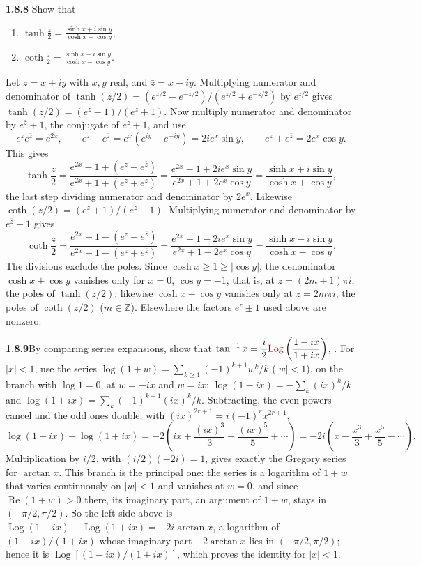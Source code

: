 \par\bigskip
\noindent\textbf{1.8.8}\quad {} Show that
\begin{enumerate}
\item[(a)] $\displaystyle\tanh\frac{z}{2}=\frac{\sinh x+i\sin y}{\cosh x+\cos y}$,
\item[(b)] $\displaystyle\coth\frac{z}{2}=\frac{\sinh x-i\sin y}{\cosh x-\cos y}$.
\end{enumerate}
\solution
Let $z=x+iy$ with $x,y$ real, and $\bar z=x-iy$. Multiplying numerator
and denominator of
$\tanh(z/2)=(e^{z/2}-e^{-z/2})/(e^{z/2}+e^{-z/2})$ by $e^{z/2}$ gives
$\tanh(z/2)=(e^z-1)/(e^z+1)$. Now multiply numerator and denominator
by $e^{\bar z}+1$, the conjugate of $e^z+1$, and use
\[
 e^ze^{\bar z}=e^{2x},\qquad
 e^z-e^{\bar z}=e^x(e^{iy}-e^{-iy})=2ie^x\sin y,\qquad
 e^z+e^{\bar z}=2e^x\cos y.
\]
This gives
\[
 \tanh\frac z2
 =\frac{e^{2x}-1+(e^z-e^{\bar z})}{e^{2x}+1+(e^z+e^{\bar z})}
 =\frac{e^{2x}-1+2ie^x\sin y}{e^{2x}+1+2e^x\cos y}
 =\frac{\sinh x+i\sin y}{\cosh x+\cos y},
\]
the last step dividing numerator and denominator by $2e^x$.
Likewise $\coth(z/2)=(e^z+1)/(e^z-1)$. Multiplying numerator and
denominator by $e^{\bar z}-1$ gives
\[
 \coth\frac z2
 =\frac{e^{2x}-1-(e^z-e^{\bar z})}{e^{2x}+1-(e^z+e^{\bar z})}
 =\frac{e^{2x}-1-2ie^x\sin y}{e^{2x}+1-2e^x\cos y}
 =\frac{\sinh x-i\sin y}{\cosh x-\cos y}.
\]
The divisions exclude the poles. Since $\cosh x\ge1\ge|\cos y|$, the
denominator $\cosh x+\cos y$ vanishes only for $x=0$, $\cos y=-1$,
that is, at $z=(2m+1)\pi i$, the poles of $\tanh(z/2)$; likewise
$\cosh x-\cos y$ vanishes only at $z=2m\pi i$, the poles of
$\coth(z/2)$ ($m\in\mathbb Z$). Elsewhere the factors $e^{\bar z}\pm1$
used above are nonzero.


\par\bigskip
\noindent\textbf{1.8.9}\quad By comparing series expansions, show that
$\displaystyle\tan^{-1}x=\frac{i}{2}\erratum{\operatorname{Log}}\left(\frac{1-ix}{1+ix}\right)$, .
\solution
For $|x|<1$, use the series
$\log(1+w)=\sum_{k\ge1}(-1)^{k+1}w^k/k$ ($|w|<1$), on the branch with
$\log1=0$, at $w=-ix$ and $w=ix$: $\log(1-ix)=-\sum_k(ix)^k/k$ and
$\log(1+ix)=\sum_k(-1)^{k+1}(ix)^k/k$. Subtracting, the even powers
cancel and the odd ones double; with $(ix)^{2r+1}=i(-1)^rx^{2r+1}$,
\[
 \log(1-ix)-\log(1+ix)
 =-2\left(ix+\frac{(ix)^3}3+\frac{(ix)^5}5+\cdots\right)
 =-2i\left(x-\frac{x^3}3+\frac{x^5}5-\cdots\right).
\]
Multiplication by $i/2$, with $(i/2)(-2i)=1$, gives exactly the Gregory
series for $\arctan x$.
This branch is the principal one: the series is a logarithm of $1+w$
that varies continuously on $|w|<1$ and vanishes at $w=0$, and since
$\operatorname{Re}(1+w)>0$ there, its imaginary part, an argument of
$1+w$, stays in $(-\pi/2,\pi/2)$. So the left side above is
$\operatorname{Log}(1-ix)-\operatorname{Log}(1+ix)=-2i\arctan x$, a
logarithm of $(1-ix)/(1+ix)$ whose imaginary part $-2\arctan x$ lies in
$(-\pi/2,\pi/2)$; hence it is $\operatorname{Log}[(1-ix)/(1+ix)]$, which
proves the identity for $|x|<1$.

